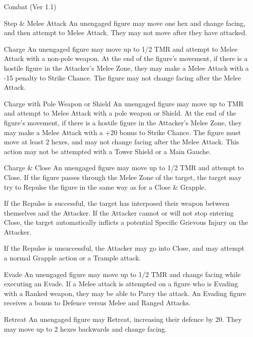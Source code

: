 \begin{Chapter}{Combat (Ver 1.1)}
\begin{Description}
\item[Step \& Melee Attack] An unengaged figure may move one hex and
  change facing, and then attempt to Melee Attack.  They may not move
  after they have attacked.

\item[Charge] An unengaged figure may move up to 1/2 TMR and attempt
  to Melee Attack with a non-pole weapon.  At the end of the figure’s
  movement, if there is a hostile figure in the Attacker’s Melee Zone,
  they may make a Melee Attack with a -15 penalty to Strike Chance.
  The figure may not change facing after the Melee Attack.

\item[Charge with Pole Weapon or Shield] An unengaged figure may move
  up to TMR and attempt to Melee Attack with a pole weapon or Shield.
  At the end of the figure’s movement, if there is a hostile figure in
  the Attacker’s Melee Zone, they may make a Melee Attack with a +20
  bonus to Strike Chance.  The figure must move at least 2 hexes, and
  may not change facing after the Melee Attack.  This action may not
  be attempted with a Tower Shield or a Main Gauche.

\item[Charge \& Close] An unengaged figure may move up to 1/2 TMR and
  attempt to Close.  If the figure passes through the Melee Zone of
  the target, the target may try to Repulse the figure in the same way
  as for a Close \& Grapple.

  If the Repulse is successful, the target has interposed their
  weapon between themselves and the Attacker.  If the Attacker cannot
  or will not stop entering Close, the target automatically inflicts a
  potential Specific Grievous Injury on the Attacker.

  If the Repulse is unsuccessful, the Attacker may go into Close, and
  may attempt a normal Grapple action or a Trample attack.

\item[Evade] An unengaged figure may move up to 1/2 TMR and change
  facing while executing an Evade.  If a Melee attack is attempted on
  a figure who is Evading with a Ranked weapon, they may be able to
  Parry the attack.  An Evading figure receives a bonus to Defence
  versus Melee and Ranged Attacks.

\item[Retreat] An unengaged figure may Retreat, increasing their
  defence by 20.  They may move up to 2 hexes backwards and change
  facing.


\end{Description}
\end{Chapter}

